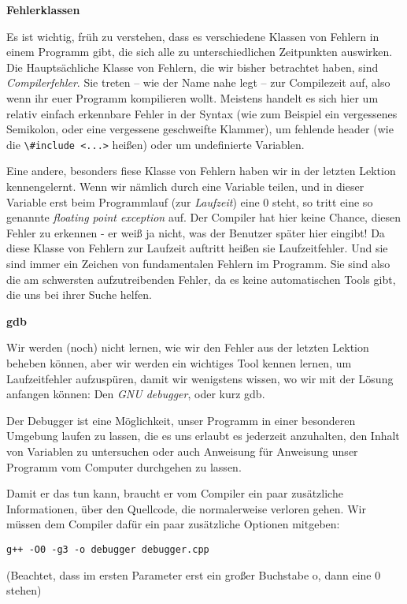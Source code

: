 
\textbf{Fehlerklassen}

Es ist wichtig, früh zu verstehen, dass es verschiedene Klassen von Fehlern in
einem \Cpp Programm gibt, die sich alle zu unterschiedlichen Zeitpunkten
auswirken. Die Hauptsächliche Klasse von Fehlern, die wir bisher betrachtet
haben, sind \emph{Compilerfehler}. Sie treten -- wie der Name nahe legt -- zur
Compilezeit auf, also wenn ihr euer Programm kompilieren wollt. Meistens
handelt es sich hier um relativ einfach erkennbare Fehler in der Syntax (wie
zum Beispiel ein vergessenes Semikolon, oder eine vergessene geschweifte
Klammer), um fehlende header (wie die \verb|\#include <...>| heißen) oder um
undefinierte Variablen.

Eine andere, besonders fiese Klasse von Fehlern haben wir in der letzten
Lektion kennengelernt. Wenn wir nämlich durch eine Variable teilen, und in
dieser Variable erst beim Programmlauf (zur \emph{Laufzeit}) eine 0 steht, so
tritt eine so genannte \emph{floating point exception} auf. Der Compiler hat
hier keine Chance, diesen Fehler zu erkennen - er weiß ja nicht, was der
Benutzer später hier eingibt! Da diese Klasse von Fehlern zur Laufzeit auftritt
heißen sie Laufzeitfehler. Und sie sind immer ein Zeichen von fundamentalen
Fehlern im Programm. Sie sind also die am schwersten aufzutreibenden Fehler, da
es keine automatischen Tools gibt, die uns bei ihrer Suche helfen.

\textbf{gdb}

Wir werden (noch) nicht lernen, wie wir den Fehler aus der letzten Lektion
beheben können, aber wir werden ein wichtiges Tool kennen lernen, um
Laufzeitfehler aufzuspüren, damit wir wenigstens wissen, wo wir mit der Lösung
anfangen können: Den \emph{GNU debugger}, oder kurz gdb.

Der Debugger ist eine Möglichkeit, unser Programm in einer besonderen Umgebung
laufen zu lassen, die es uns erlaubt es jederzeit anzuhalten, den Inhalt von
Variablen zu untersuchen oder auch Anweisung für Anweisung unser Programm vom
Computer durchgehen zu lassen.

Damit er das tun kann, braucht er vom Compiler ein paar zusätzliche
Informationen, über den Quellcode, die normalerweise verloren gehen. Wir müssen
dem Compiler dafür ein paar zusätzliche Optionen mitgeben:
\begin{verbatim}
g++ -O0 -g3 -o debugger debugger.cpp
\end{verbatim}
(Beachtet, dass im ersten Parameter erst ein großer Buchstabe o, dann eine 0 stehen)

